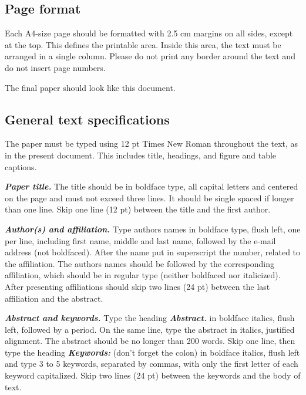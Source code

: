 \documentclass[12pt,fleqn]{article}
\begin{document}
\subsection{Page format}
Each A4-size page should be formatted with 2.5 cm margins on all sides, except at the top. This defines the printable area. Inside this area, the text must be arranged in a single column. Please do not print any border around the text and do not insert page numbers.

The final paper should look like this document.

\subsection{General text specifications}

The paper must be typed using 12 pt Times New Roman throughout the text, as in the present document. This includes title, headings, and figure and table captions.

\vspace{0.5cm} %

\textbf{\textit{Paper title.}} The title should be in boldface type, all capital letters and centered on the page and must not exceed three lines. It should be single spaced if longer than one line. Skip one line (12 pt) between the title and the first author.

\vspace{0.5cm} %

\textbf{\textit{Author(s) and affiliation.}} Type authors names in boldface type, flush left, one per line, including first name, middle and last name, followed by the e-mail address (not boldfaced). After the name put in superscript the number, related to the affiliation. The authors names should be followed by the corresponding affiliation, which should be in regular type (neither boldfaced nor italicized). After presenting affiliations should skip two lines (24 pt) between the last affiliation and the abstract.

\vspace{0.5cm} %

\textbf{\textit{Abstract and keywords.}} Type the heading \textbf{\textit{Abstract.}} in boldface italics, flush left, followed by a period. On the same line, type the abstract in italics, justified alignment. The abstract should be no longer than 200 words. Skip one line, then type the heading \textbf{\textit{Keywords:}} (don't forget the colon) in boldface italics, flush left and type 3 to 5 keywords, separated by commas, with only the first letter of each keyword capitalized. Skip two lines (24 pt) between the keywords and the body of text.
\end{document}
